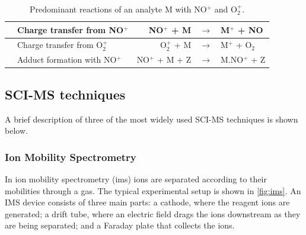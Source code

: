 \begin{table}[t]
\centering
\caption{Predominant reactions of an analyte M with NO$^+$ and O$_2^+$.}%
\label{tb:ct}
\begin{tabular}{ll rcl}
\toprule
\qquad& Charge transfer from NO$^+$ & NO$^+$ + M&$\rightarrow$&M$^+$ + NO
\\ \midrule
&Charge transfer from O$_2^+$ & O$_2^+$ + M&$\rightarrow$&M$^+$ + O$_2$
\\ \midrule
&Adduct formation with NO$^+$ & NO$^+$ + M + Z&$\rightarrow$&M.NO$^+$ + Z
\\ \bottomrule
\end{tabular}
\end{table}









\subsection{SCI-MS techniques}


A brief description of three of the most widely used SCI-MS techniques is shown below.


\subsubsection{Ion Mobility Spectrometry}
In ion mobility spectrometry (\acrshort{ims}) ions are separated according to their mobilities through a gas. The typical experimental setup is shown in \autoref{fig:ims}. An IMS device consists of three main parts:
a cathode, where the reagent ions are generated; a drift tube, where an electric field drags the ions downstream as they are being separated; and a Faraday plate that collects the ions.


